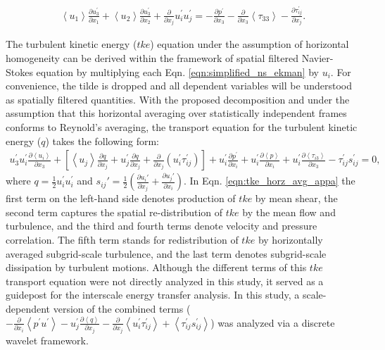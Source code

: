 \begin{align}
 \left < u_1 \right > \frac{\partial u_3^{\prime}}{\partial x_1}  + \left < u_2 \right > \frac{\partial u_3^{\prime}}{\partial x_2} +\frac{\partial }{\partial x_j} u_i^{\prime}u_j^{\prime} = -\frac{\partial p^{\prime} }{\partial x_3} -\frac{\partial }{\partial x_3} \left < \tau_{33}\right > - \frac{\partial \tau_{ij}^{\prime}}{\partial x_j}.
 \label{eqn:simplified_ns_ekman}
\end{align}

The turbulent kinetic energy ($tke$) equation under the assumption of horizontal homogeneity can be derived within the framework of spatial filtered Navier-Stokes equation by multiplying each Eqn.  \ref{eqn:simplified_ns_ekman} by $u_i$. For convenience, the tilde is dropped and all dependent variables will be understood as spatially filtered quantities. With the proposed decomposition and under the assumption that this horizontal averaging over statistically independent frames conforms to Reynold's averaging, the transport equation for the turbulent kinetic energy ($q$) takes the following form:
\begin{align}
u_3^\prime u_i^\prime \frac{\partial \left< u_i \right>}{\partial x_3}+[\left< u_j\right>\frac{\partial q}{\partial x_j}+u_j^\prime\frac{\partial q}{\partial x_j}+\frac{\partial }{\partial x_j}(u_i^\prime \tau_{ij}^\prime)]+u_i^\prime\frac{\partial p^\prime}{\partial x_i}+ u_i^\prime \frac{\partial \left < p \right >}{\partial x_i}+u_i^\prime\frac{\partial \left < \tau_{i3} \right >}{\partial x_3}-\tau_{ij}^\prime s_{ij}^\prime =0,
\label{eqn:tke_horz_avg_appa}
\end{align}
\noindent where $q=\frac{1}{2}u^{\prime}_i u^{\prime}_i$ and $s_{ij}'=\frac{1}{2}(\frac{\partial u_{i}'}{\partial x_j}+\frac{\partial u_{j}'}{\partial x_i})$.
In Eqn. \ref{eqn:tke_horz_avg_appa} the first term on the left-hand side denotes production of $tke$ by mean shear, the second term captures the spatial re-distribution of $tke$ by the mean flow and turbulence, and the third and fourth terms denote velocity and pressure correlation.  The fifth term stands for redistribution of $tke$ by horizontally averaged subgrid-scale turbulence, and the last term denotes subgrid-scale dissipation by turbulent motions. Although the different terms of this $tke$ transport equation were not directly analyzed in this study, it served as a guidepost for the interscale energy transfer analysis. In this study, a scale-dependent version of the combined terms ($-\frac{\partial }{\partial x_i}\left< p^\prime u^\prime\right>-u_j^\prime\frac{\partial \left< q\right>}{\partial x_j}-\frac{\partial}{\partial x_j}\left< u_i^\prime\tau_{ij}^\prime \right>+\left< \tau_{ij}^\prime s_{ij}^\prime\right>$) was analyzed via a discrete wavelet framework. 
